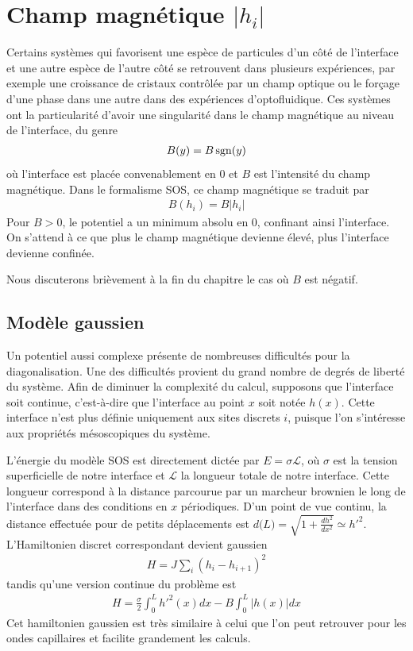 \chapter{Champ magnétique $|h_i|$}
\label{sec_laser}

Certains systèmes qui favorisent une espèce de particules d'un côté de l'interface et une autre espèce de l'autre côté se retrouvent dans plusieurs expériences, par exemple une croissance de cristaux contrôlée par un champ optique\cite{} ou le forçage d'une phase dans une autre dans des expériences d'optofluidique\cite{delville}. Ces systèmes ont la particularité d'avoir une singularité dans le champ magnétique au niveau de l'interface, du genre 
\begin{align}
	B(y) = B \operatorname{sgn}(y)
\end{align}
 où l'interface est placée convenablement en $0$ et $B$ est l'intensité du champ magnétique. Dans le formalisme SOS, ce champ magnétique se traduit par 
\begin{align}
	B(h_i) = B |h_i|
\end{align}
Pour $B>0$, le potentiel a un minimum absolu en $0$, confinant ainsi l'interface. On s'attend à ce que plus le champ magnétique devienne élevé, plus l'interface devienne confinée. 

Nous discuterons brièvement à la fin du chapitre le cas où $B$ est négatif.


	\section{Modèle gaussien}

Un potentiel aussi complexe présente de nombreuses difficultés pour la diagonalisation. Une des difficultés provient du grand nombre de degrés de liberté du système. Afin de diminuer la complexité du calcul, supposons que l'interface soit continue, c'est-à-dire que l'interface au point $x$ soit notée $h(x)$. Cette interface n'est plus définie uniquement aux sites discrets $i$, puisque l'on s'intéresse aux propriétés mésoscopiques du système.

L'énergie du modèle SOS est directement dictée par $E = \sigma \mathcal{L}$, où $\sigma$ est la tension superficielle de notre interface et $\mathcal{L}$ la longueur totale de notre interface. Cette longueur correspond à la distance parcourue par un marcheur brownien le long de l'interface dans des conditions en $x$ périodiques. D'un point de vue continu, la distance effectuée pour de petits déplacements est $d\mathcal(L) = \sqrt{1+\frac{dh^2}{dx^2}} \simeq h'^2 $.
L'Hamiltonien discret correspondant devient gaussien
\begin{align}
    H = J \sum_i (h_i-h_{i+1})^2
\end{align}
tandis qu'une version continue du problème est 
\begin{align}
	H = \frac{\sigma}{2} \int_0^L h'^2(x) dx - B \int_0^L |h(x)|dx
\end{align}
Cet hamiltonien gaussien est très similaire à celui que l'on peut retrouver pour les ondes capillaires\cite{} et facilite grandement les calculs. 

